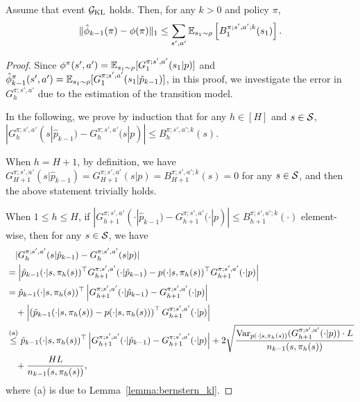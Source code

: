 \begin{lemma} \label{lemma:error_in_visitation}
	Assume that event $\mathcal{G}_{\textup{KL}}$ holds. Then, for any $k>0$ and policy $\pi$,
	\begin{align*}
		\|\hat{\phi}_{k-1}(\pi) -\phi(\pi) \|_1  \leq \sum_{s',a'} \mathbb{E}_{s_1 \sim \rho}\left[ B^{\pi;s',a';k}_1(s_1) \right] .
	\end{align*}
\end{lemma}
\begin{proof}
	Since $\phi^{\pi}(s',a')=\mathbb{E}_{s_1 \sim \rho}[G^{\pi;s',a'}_1(s_1|p)]$ and $\hat{\phi}_{k-1}^{\pi}(s',a')=\mathbb{E}_{s_1 \sim \rho}[G^{\pi;s',a'}_1(s_1|\hat{p}_{k-1})]$, in this proof, we investigate the error in $G^{\pi;s',a'}_h$ due to the estimation of the transition model.
	
	In the following, we prove by induction that for any $h 
	\in [H]$ and $s \in \mathcal{S}$, $|G^{\pi;s',a'}_{h}(s|\hat{p}_{k-1}) - G^{\pi;s',a'}_{h}(s|p)| \leq B^{\pi;s',a';k}_{h}(s)$.
	
	When $h=H+1$, by definition, we have $G^{\pi;s',a'}_{H+1}(s|\hat{p}_{k-1}) = G^{\pi;s',a'}_{H+1}(s|p) = B^{\pi;s',a';k}_{H+1}(s) = 0$ for any $s \in \mathcal{S}$, and then the above statement trivially holds. 
	
	When $1\leq h \leq H$, if $|G^{\pi;s',a'}_{h+1}(\cdot|\hat{p}_{k-1}) - G^{\pi;s',a'}_{h+1}(\cdot|p)| \leq B^{\pi;s',a';k}_{h+1}(\cdot)$ element-wise, then for any $s \in \mathcal{S}$, we have 
	\begin{align}
		&\quad |G^{\pi;s',a'}_h(s|\hat{p}_{k-1}) - G^{\pi;s',a'}_h(s|p)| 
		\nonumber\\
		&= \left| \hat{p}_{k-1}(\cdot|s,\pi_h(s))^\top G^{\pi;s',a'}_{h+1}(\cdot|\hat{p}_{k-1}) - p(\cdot|s,\pi_h(s))^\top G^{\pi;s',a'}_{h+1}(\cdot|p) \right|
		\nonumber\\
		&= \hat{p}_{k-1}(\cdot|s,\pi_h(s))^\top \left| G^{\pi;s',a'}_{h+1}(\cdot|\hat{p}_{k-1}) - G^{\pi;s',a'}_{h+1}(\cdot|p)  \right|
		\nonumber\\
		&\quad + \left| \left( \hat{p}_{k-1}(\cdot|s,\pi_h(s)) - p(\cdot|s,\pi_h(s)) \right)^\top G^{\pi;s',a'}_{h+1}(\cdot|p)  \right|
		\nonumber\\
		&\overset{\textup{(a)}}{\leq} \hat{p}_{k-1}(\cdot|s,\pi_h(s))^\top \left| G^{\pi;s',a'}_{h+1}(\cdot|\hat{p}_{k-1}) - G^{\pi;s',a'}_{h+1}(\cdot|p)  \right| +  2\sqrt{\frac{\textup{Var}_{p(\cdot|s,\pi_h(s))}(G^{\pi;s',a'}_{h+1}(\cdot|p)) \cdot L}{n_{k-1}(s,\pi_h(s))}} 
		\nonumber\\
		&\quad + \frac{HL}{n_{k-1}(s,\pi_h(s))}  , \label{eq:diff_G_hat_p_G_p}
	\end{align}
	where (a) is due to Lemma~\ref{lemma:bernstern_kl}.
	

\end{proof}
